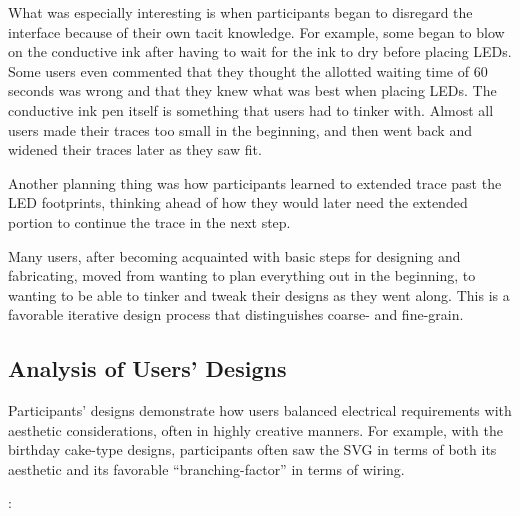 \documentclass{sigchi}
\begin{document}
  What was especially interesting is when participants began to disregard the interface because of their own tacit knowledge. For example, some began to blow on the conductive ink after having to wait for the ink to dry before placing LEDs. Some users even commented that they thought the allotted waiting time of 60 seconds was wrong and that they knew what was best when placing LEDs. The conductive ink pen itself is something that users had to tinker with. Almost all users made their traces too small in the beginning, and then went back and widened their traces later as they saw fit.
  
  Another planning thing was how participants learned to extended trace past the LED footprints, thinking ahead of how they would later need the extended portion to continue the trace in the next step.
  
  Many users, after becoming acquainted with basic steps for designing and fabricating, moved from wanting to plan everything out in the beginning, to wanting to be able to tinker and tweak their designs as they went along. This is a favorable iterative design process that distinguishes coarse- and fine-grain.

\subsection{Analysis of Users' Designs}
  Participants' designs demonstrate how users balanced electrical requirements with aesthetic considerations, often in highly creative manners. For example, with the birthday cake-type designs, participants often saw the SVG in terms of both its aesthetic and its favorable ``branching-factor'' in terms of wiring.
  
  \begin{myquote}
   \vspace{-2pt}
    :
    \vspace{-2pt}
  \end{myquote}
  
 
\end{document}
